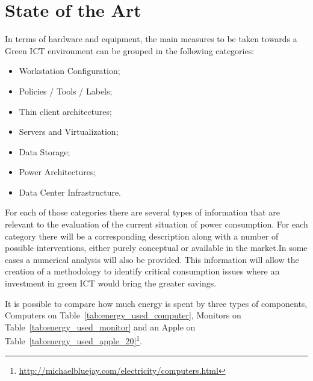 

\chapter{State of the Art} \label{chap2:state_of_the_art}
    In terms of hardware and equipment, the main measures to be taken towards a Green ICT environment can be grouped in the following categories:%
    \begin{itemize}
        \item Workstation Configuration;
        \item Policies / Tools / Labels;
        \item Thin client architectures;
        \item Servers and Virtualization;
        \item Data Storage;
        \item Power Architectures;
        \item Data Center Infrastructure.
    \end{itemize}
    
    For each of those categories there are several types of information that are relevant to the evaluation of the current situation of power consumption. For each category there will be a corresponding description along with a number of possible interventions, either purely conceptual or available in the market.In some cases a numerical analysis will also be provided. This information will allow the creation of a methodology to identify critical consumption issues where an investment in green ICT would bring the greater savings.
    
    It is possible to compare how much energy is spent by three types of components, Computers on Table~\ref{tab:energy_used_computer}, Monitors on Table~\ref{tab:energy_used_monitor} and an Apple on Table~\ref{tab:energy_used_apple_20}\footnote{\url{http://michaelbluejay.com/electricity/computers.html}}.
    
